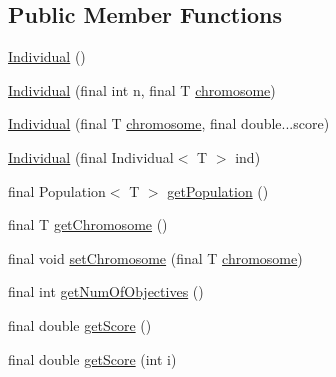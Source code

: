 \subsection*{Public Member Functions}
\begin{DoxyCompactItemize}
\item 
\hyperlink{classjenes_1_1population_1_1_individual_3_01_t_01extends_01_chromosome_01_4_aaef7161bf62cee0ac95f079394fdac9f}{Individual} ()
\item 
\hyperlink{classjenes_1_1population_1_1_individual_3_01_t_01extends_01_chromosome_01_4_ab976f777177706bca918974cc60728c9}{Individual} (final int n, final T \hyperlink{classjenes_1_1population_1_1_individual_3_01_t_01extends_01_chromosome_01_4_ab83da09312b8d5c807d6e6d04692e1a4}{chromosome})
\item 
\hyperlink{classjenes_1_1population_1_1_individual_3_01_t_01extends_01_chromosome_01_4_a0ee89d719da75153410f8757ebafdb0d}{Individual} (final T \hyperlink{classjenes_1_1population_1_1_individual_3_01_t_01extends_01_chromosome_01_4_ab83da09312b8d5c807d6e6d04692e1a4}{chromosome}, final double...\-score)
\item 
\hyperlink{classjenes_1_1population_1_1_individual_3_01_t_01extends_01_chromosome_01_4_a39ca92146563b3b00576736296b523a5}{Individual} (final Individual$<$ T $>$ ind)
\item 
final Population$<$ T $>$ \hyperlink{classjenes_1_1population_1_1_individual_3_01_t_01extends_01_chromosome_01_4_a15020083468eb11265c621aca7de0bf2}{get\-Population} ()
\item 
final T \hyperlink{classjenes_1_1population_1_1_individual_3_01_t_01extends_01_chromosome_01_4_aeed25204463ec1e7eebe36674a24ada7}{get\-Chromosome} ()
\item 
final void \hyperlink{classjenes_1_1population_1_1_individual_3_01_t_01extends_01_chromosome_01_4_a14c0669f286f8097bb8fdf13dc5fcf50}{set\-Chromosome} (final T \hyperlink{classjenes_1_1population_1_1_individual_3_01_t_01extends_01_chromosome_01_4_ab83da09312b8d5c807d6e6d04692e1a4}{chromosome})
\item 
final int \hyperlink{classjenes_1_1population_1_1_individual_3_01_t_01extends_01_chromosome_01_4_a1c109dce60908107cc2dcfaf630b95f5}{get\-Num\-Of\-Objectives} ()
\item 
final double \hyperlink{classjenes_1_1population_1_1_individual_3_01_t_01extends_01_chromosome_01_4_aa95dc3489632913f59c9c9e5d30d89c0}{get\-Score} ()
\item 
final double \hyperlink{classjenes_1_1population_1_1_individual_3_01_t_01extends_01_chromosome_01_4_ad2cc30ec43ca42539e72c4619953fd3b}{get\-Score} (int i)

\end{DoxyCompactItemize}
